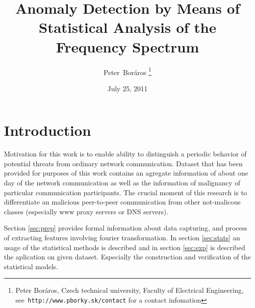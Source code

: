 \documentclass[a4paper,journal]{IEEEtran}
\begin{document}
\title{Anomaly Detection by Means of Statistical Analysis of the Frequency Spectrum}
\date{July 25, 2011}
\author{Peter~Boráros %
\thanks{{Peter Boráros}, Czech technical university, Faculty of Electrical Engineering,
see~\texttt{http://www.pborky.sk/contact} for a contact infomation}}%



\maketitle
\IEEEdisplaynotcompsoctitleabstractindextext
\IEEEpeerreviewmaketitle

\section{Introduction}\label{intro}
Motivation for this work is to enable ability to distinguish a periodic behavior of potential threats from ordinary
network communication. Dataset that has been provided for purposes of this work contains an agregate information of 
about one day of the network communication as well as the information of malignancy of particular communication 
participants. The crucial moment of this research is to differentiate an malicious peer-to-peer communication from
other not-malicous classes (especially www proxy servers or DNS servers).

Section \ref{sec:prep} provides formal information about data capturing, and process of extracting features involving 
fourier transformation. In section \ref{sec:stats} an usage of the statistical methods is described and in section 
\ref{sec:exp} is described the aplication on given dataset. 
Especially the construction and verification of the statistical models. 
\end{document}

